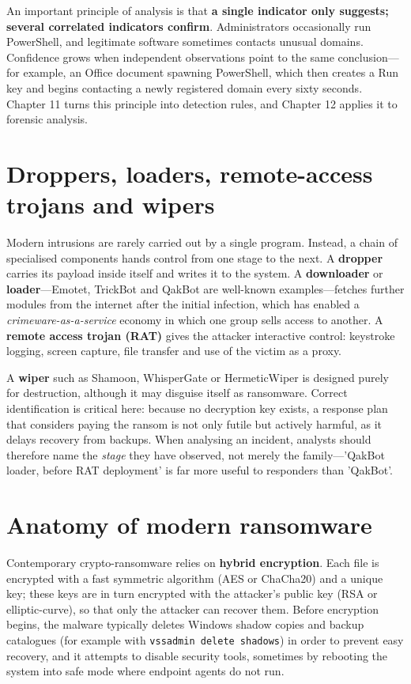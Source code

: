 An important principle of analysis is that \textbf{a single indicator only suggests; several correlated indicators confirm}. Administrators occasionally run PowerShell, and legitimate software sometimes contacts unusual domains. Confidence grows when independent observations point to the same conclusion—for example, an Office document spawning PowerShell, which then creates a Run key and begins contacting a newly registered domain every sixty seconds. Chapter 11 turns this principle into detection rules, and Chapter 12 applies it to forensic analysis.

\section{Droppers, loaders, remote-access trojans and wipers}\label{sec:4.4}
Modern intrusions are rarely carried out by a single program. Instead, a chain of specialised components hands control from one stage to the next. A \textbf{dropper} carries its payload inside itself and writes it to the system. A \textbf{downloader} or \textbf{loader}—Emotet, TrickBot and QakBot are well-known examples—fetches further modules from the internet after the initial infection, which has enabled a \emph{crimeware-as-a-service} economy in which one group sells access to another. A \textbf{remote access trojan (RAT)} gives the attacker interactive control: keystroke logging, screen capture, file transfer and use of the victim as a proxy.

A \textbf{wiper} such as Shamoon, WhisperGate or HermeticWiper is designed purely for destruction, although it may disguise itself as ransomware. Correct identification is critical here: because no decryption key exists, a response plan that considers paying the ransom is not only futile but actively harmful, as it delays recovery from backups. When analysing an incident, analysts should therefore name the \emph{stage} they have observed, not merely the family—'QakBot loader, before RAT deployment' is far more useful to responders than 'QakBot'.

\section{Anatomy of modern ransomware}\label{sec:4.5}
Contemporary crypto-ransomware relies on \textbf{hybrid encryption}. Each file is encrypted with a fast symmetric algorithm (AES or ChaCha20) and a unique key; these keys are in turn encrypted with the attacker's public key (RSA or elliptic-curve), so that only the attacker can recover them. Before encryption begins, the malware typically deletes Windows shadow copies and backup catalogues (for example with \texttt{vssadmin delete shadows}) in order to prevent easy recovery, and it attempts to disable security tools, sometimes by rebooting the system into safe mode where endpoint agents do not run.


